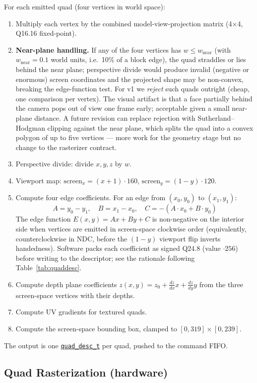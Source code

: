 \documentclass[11pt]{article}
\begin{document}
For each emitted quad (four vertices in world space):
\begin{enumerate}
\item Multiply each vertex by the combined model-view-projection matrix (4$\times$4, Q16.16 fixed-point).
\item \textbf{Near-plane handling.} If any of the four vertices has $w \leq w_{\text{near}}$ (with $w_{\text{near}} = 0.1$ world units, i.e.\ 10\% of a block edge), the quad straddles or lies behind the near plane; perspective divide would produce invalid (negative or enormous) screen coordinates and the projected shape may be non-convex, breaking the edge-function test. For v1 we \emph{reject} such quads outright (cheap, one comparison per vertex). The visual artifact is that a face partially behind the camera pops out of view one frame early; acceptable given a small near-plane distance. A future revision can replace rejection with Sutherland--Hodgman clipping against the near plane, which splits the quad into a convex polygon of up to five vertices --- more work for the geometry stage but no change to the rasterizer contract.
\item Perspective divide: divide $x, y, z$ by $w$.
\item Viewport map: $\text{screen}_x = (x+1) \cdot 160$, $\text{screen}_y = (1-y) \cdot 120$.
\item Compute four edge coefficients. For an edge from $(x_0, y_0)$ to $(x_1, y_1)$:
\[ A = y_0 - y_1, \quad B = x_1 - x_0, \quad C = -(A \cdot x_0 + B \cdot y_0) \]
The edge function $E(x,y) = Ax + By + C$ is non-negative on the interior side when vertices are emitted in screen-space clockwise order (equivalently, counterclockwise in NDC, before the $(1-y)$ viewport flip inverts handedness). Software packs each coefficient as signed Q24.8 (value $\cdot 256$) before writing to the descriptor; see the rationale following Table~\ref{tab:quaddesc}.
\item Compute depth plane coefficients $z(x,y) = z_0 + \frac{dz}{dx}x + \frac{dz}{dy}y$ from the three screen-space vertices with their depths.
\item Compute UV gradients for textured quads.
\item Compute the screen-space bounding box, clamped to $[0, 319] \times [0, 239]$.
\end{enumerate}

The output is one \hyperref[sec:quaddesc]{\texttt{quad\_desc\_t}} per quad, pushed to the command FIFO.

\subsection{Quad Rasterization (hardware)}
\label{sec:rast}
\end{document}
